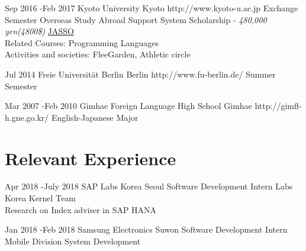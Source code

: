 \documentclass[10pt]{article} %
\begin{document}

\if{}
\job
{Sep 2016 -}{Feb 2017}
{Kyoto University}
{Kyoto}
{http://www.kyoto-u.ac.jp}
{Exchange Semester}
{
Overseas Study Abroad Support System Scholarship - \textit{480,000 yen(4800\$)} \href{http://www.jasso.go.jp/ryugaku/tantosha/study_a/short_term_h/index.html}{JASSO}\\
Related Courses: Programming Languages\\
Activities and societies: FleeGarden, Athletic circle
}



\jobnocontent
{Jul 2014}{}
{Freie Universität Berlin}
{Berlin}
{http://www.fu-berlin.de/}
{Summer Semester}




\jobnocontent
{Mar 2007 -}{Feb 2010}
{Gimhae Foreign Language High School}
{Gimhae}
{http://gimfl-h.gne.go.kr/}
{English-Japanese Major}
\fi

\section{Relevant Experience}

\job
{Apr 2018 -}{July 2018}
{SAP Labs Korea}
{Seoul}
{}
{Software Development Intern}
{Labs Korea Kernel Team\\
Research on Index adviser in SAP HANA}

\job
{Jan 2018 -}{Feb 2018}
{Samsung Electronics}
{Suwon}
{}
{Software Development Intern}
{Mobile Division System Development}
\end{document}
